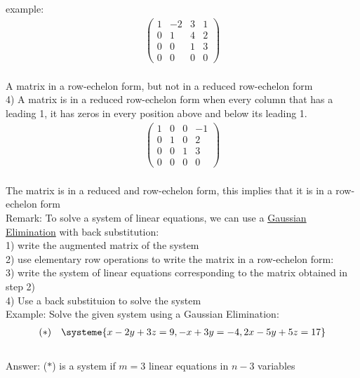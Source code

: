 \documentclass{jhwhw}
\begin{document}
example:
\begin{align*} 
\begin{pmatrix} 1 & -2 & 3 & 1 \\ 0 & 1 & 4 & 2 \\ 0 & 0 & 1 & 3 \\ 0 & 0 & 0 & 0 \end{pmatrix}\\
\end{align*}

A matrix in a row-echelon form, but not in a reduced row-echelon form\\

4) A matrix is in a reduced row-echelon form when every column that has a leading 1, it has zeros in every position above and below its leading 1.\\

\begin{align*} 
\begin{pmatrix} 1 & 0 & 0 & -1 \\ 0 & 1 & 0 & 2 \\ 0 & 0 & 1 & 3 \\ 0 & 0 & 0 & 0 \end{pmatrix}\\
\end{align*}

The matrix is in a reduced and row-echelon form, this implies that it is in a row-echelon form\\

Remark: To solve a system of linear equations, we can use a \underline{Gaussian Elimination} with back substitution:\\

1) write the augmented matrix of the system\\
2) use elementary row operations to write the matrix in a row-echelon form:\\
3) write the system of linear equations corresponding to the matrix obtained in step 2)\\
4) Use a back substituion to solve the system\\

Example: Solve the given system using a Gaussian Elimination:
\\
\begin{align*} (\ast) \quad \systeme{x-2y+3z=9, -x+3y=-4, 2x-5y+5z=17} \end{align*}\\

Answer: (\(\ast\)) is a system if \(m=3\) linear equations in \(n-3\) variables\\
\end{document}
